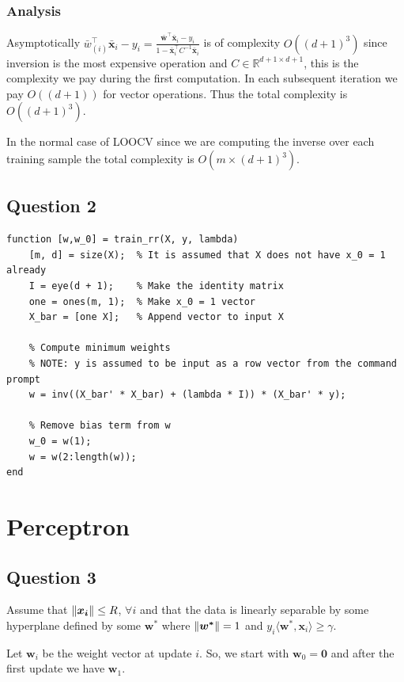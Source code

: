 \documentclass[11pt, oneside]{article}   	%
\begin{document}
\subsubsection{Analysis}
Asymptotically $\bar{w}_{(i)}^\top \boldsymbol{\bar{x}}_i - y_i =  \frac{\boldsymbol{\bar{w}}^\top \boldsymbol{\bar{x}}_i - y_i} {1 - \boldsymbol{\bar{x}}_i^\top C^{-1} \boldsymbol{\bar{x}}_i}$ is of complexity $O((d + 1)^3)$ since inversion is the most expensive operation and $C \in \mathbb{R}^{d+1 \times d + 1}$, this is the complexity we pay during the first computation.  In each subsequent iteration we pay $O((d + 1))$ for vector operations.  Thus the total complexity is  $O((d + 1)^3)$. 

In the normal case of LOOCV since we are computing the inverse over each training sample the total complexity is $O(m \times (d + 1)^3)$.

\newpage{}
\subsection{Question 2}
\begin{verbatim}
function [w,w_0] = train_rr(X, y, lambda)
    [m, d] = size(X);  % It is assumed that X does not have x_0 = 1 already
    I = eye(d + 1);    % Make the identity matrix
    one = ones(m, 1);  % Make x_0 = 1 vector
    X_bar = [one X];   % Append vector to input X
    
    % Compute minimum weights
    % NOTE: y is assumed to be input as a row vector from the command prompt
    w = inv((X_bar' * X_bar) + (lambda * I)) * (X_bar' * y);
    
    % Remove bias term from w
    w_0 = w(1);
    w = w(2:length(w));
end
\end{verbatim}

\section{Perceptron}
\subsection{Question 3}
Assume that $\lVert\boldsymbol{x_i}\rVert \leq R$, $\forall i$ and that the data is linearly separable by some hyperplane defined by some $\boldsymbol{w^*}$ where $\lVert\boldsymbol{w^*}\rVert = 1$ and $y_i \langle \boldsymbol{w^*}, \boldsymbol{x}_i\rangle \geq \gamma$.

Let $\boldsymbol{w}_{i}$ be the weight vector at update $i$.  So, we start with $\boldsymbol{w}_{0} = \boldsymbol{0}$ and after the first update we have $\boldsymbol{w}_{1}$.
\end{document}
